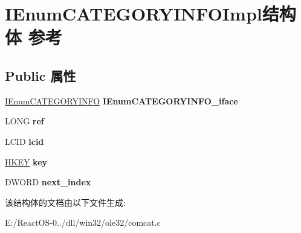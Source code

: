 \hypertarget{struct_i_enum_c_a_t_e_g_o_r_y_i_n_f_o_impl}{}\section{I\+Enum\+C\+A\+T\+E\+G\+O\+R\+Y\+I\+N\+F\+O\+Impl结构体 参考}
\label{struct_i_enum_c_a_t_e_g_o_r_y_i_n_f_o_impl}
\subsection*{Public 属性}
\begin{DoxyCompactItemize}
\item 
\mbox{\label{struct_i_enum_c_a_t_e_g_o_r_y_i_n_f_o_impl_a7d649c267cd979ec897e35ac64208cfb}} 
\hyperlink{interface_i_enum_c_a_t_e_g_o_r_y_i_n_f_o}{I\+Enum\+C\+A\+T\+E\+G\+O\+R\+Y\+I\+N\+FO} {\bfseries I\+Enum\+C\+A\+T\+E\+G\+O\+R\+Y\+I\+N\+F\+O\+\_\+iface}
\item 
\mbox{\label{struct_i_enum_c_a_t_e_g_o_r_y_i_n_f_o_impl_aa9b383b34e96bee5347ea77aafe2c7c2}} 
L\+O\+NG {\bfseries ref}
\item 
\mbox{\label{struct_i_enum_c_a_t_e_g_o_r_y_i_n_f_o_impl_ae914861b7c532f75fd89e00b547c3455}} 
L\+C\+ID {\bfseries lcid}
\item 
\mbox{\label{struct_i_enum_c_a_t_e_g_o_r_y_i_n_f_o_impl_a7ca1c66ae8a4802eab033b7f87a62096}} 
\hyperlink{interfacevoid}{H\+K\+EY} {\bfseries key}
\item 
\mbox{\label{struct_i_enum_c_a_t_e_g_o_r_y_i_n_f_o_impl_a8898edf2d1c35daad4b36e16589d8d53}} 
D\+W\+O\+RD {\bfseries next\+\_\+index}
\end{DoxyCompactItemize}


该结构体的文档由以下文件生成\+:\begin{DoxyCompactItemize}
\item 
E\+:/\+React\+O\+S-\/0../dll/win32/ole32/comcat.\+c\end{DoxyCompactItemize}
